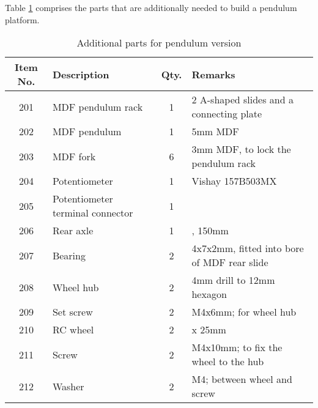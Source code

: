 \documentclass[10pt,a4paper]{article}
\begin{document}
\noindent Table \ref{parts_pendulum} comprises the parts that are additionally needed to build a pendulum platform.
\begin{table}[H]
	\centering
	\begin{tabular}{| c | l | c | l|}
		\hline
		Item No. & Description & Qty. & Remarks \\ \hline
		201 & MDF pendulum rack & 1 & \footnotesize 2 A-shaped slides and a connecting plate\\ \hline
		202 & MDF pendulum & 1 & \footnotesize 5mm MDF\\ \hline
		203 & MDF fork & 6 & \footnotesize 3mm MDF, to lock the pendulum rack\\ \hline
		204 & Potentiometer & 1 & \footnotesize Vishay 157B503MX\\ \hline
		205 & Potentiometer terminal connector & 1 & \\ \hline
		206 & Rear axle & 1 & \footnotesize \diameter4mm, 150mm\\ \hline
		207 & Bearing & 2 & \footnotesize 4x7x2mm, fitted into bore of MDF rear slide\\ \hline
		208 & Wheel hub & 2 & \footnotesize 4mm drill to 12mm hexagon\\ \hline
		209 & Set screw & 2 & \footnotesize M4x6mm; for wheel hub\\ \hline
		210 & RC wheel & 2 & \footnotesize \diameter 65mm x 25mm\\ \hline
		211 & Screw & 2 & \footnotesize M4x10mm; to fix the wheel to the hub\\ \hline
		212 & Washer & 2 & \footnotesize M4; between wheel and screw\\ \hline
	\end{tabular}
	\caption{Additional parts for pendulum version}\label{parts_pendulum}
\end{table}

\newpage
\end{document}
